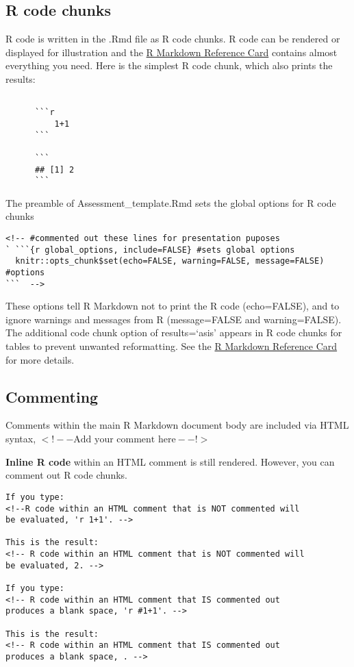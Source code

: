 \documentclass[12pt,]{article}
\begin{document}
\subsection{R code chunks}\label{r-code-chunks}

R code is written in the .Rmd file as R code chunks. R code can be
rendered or displayed for illustration and the
\href{https://www.rstudio.com/wp-content/uploads/2015/03/rmarkdown-reference.pdf}{R
Markdown Reference Card} contains almost everything you need. Here is
the simplest R code chunk, which also prints the results:

\begin{Verbatim}[frame=single]
      
      ```r
          1+1
      ```
      
      ```
      ## [1] 2
      ```
\end{Verbatim}

The preamble of Assessment\_template.Rmd sets the global options for R
code chunks

\begin{Verbatim}[frame=single]
<!-- #commented out these lines for presentation puposes
` ```{r global_options, include=FALSE} #sets global options 
  knitr::opts_chunk$set(echo=FALSE, warning=FALSE, message=FALSE) #options
```  -->
\end{Verbatim}

These options tell R Markdown not to print the R code (echo=FALSE), and
to ignore warnings and messages from R (message=FALSE and
warning=FALSE). The additional code chunk option of results=`asis'
appears in R code chunks for tables to prevent unwanted reformatting.
See the
\href{https://www.rstudio.com/wp-content/uploads/2015/03/rmarkdown-reference.pdf}{R
Markdown Reference Card} for more details.

\newpage

\subsection{Commenting}\label{commenting}

Comments within the main R Markdown document body are included via HTML
syntax, \(<!-- \text{Add your comment here} --!>\)

\textbf{Inline R code} within an HTML comment is still rendered.
However, you can comment out R code chunks.

\begin{Verbatim}[frame=single]
If you type:
<!--R code within an HTML comment that is NOT commented will
be evaluated, 'r 1+1'. -->

This is the result:
<!-- R code within an HTML comment that is NOT commented will 
be evaluated, 2. -->

If you type:
<!-- R code within an HTML comment that IS commented out  
produces a blank space, 'r #1+1'. -->

This is the result:
<!-- R code within an HTML comment that IS commented out  
produces a blank space, . -->

\end{Verbatim}
\end{document}
